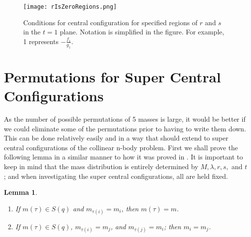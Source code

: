 \documentclass[11pt,leqno]{article}
\newtheorem{lemma}[theorem]{Lemma}
\theoremstyle{definition}
\theoremstyle{remark}
\numberwithin{equation}{section}
\begin{document}
\begin{figure}
\texttt{[image: rIsZeroRegions.png]}
 \caption{ \label{EL}  Conditions for central configuration for specified regions of $r$ and $s$ in the $t=1$ plane. Notation is simplified in the figure. For example, 1 represents $-\frac{f_1}{g_1}$.}
\end{figure}


\section{Permutations for Super Central Configurations}
As the number of possible permutations of 5 masses is large, it would be better if we could eliminate some of the permutations prior to having to write them down. This can be done relatively easily and in a way that should extend to super central configurations of the collinear n-body problem. First we shall prove the following lemma in a similar manner to how it was proved in \cite{ZX3}. It is important to keep in mind that the mass distribution is entirely determined by $M, \lambda, r,s,$ and $t$; and when investigating the super central configurations, all are held fixed.

\begin{lemma}
\begin{enumerate}
Fix $q=(-s-1, -1, r, 1, t+1)$ with $(s,t)\in \mathbf{R^+}^3$ and $-1<r<1$. Suppose $m=(m_1, m_2, m_3, m_4, m_5)\in S(q)$ and $\tau \in P(5)$. 
\item If $m(\tau)\in S(q)$ and $m_{\tau(i)}=m_i$, then $m(\tau)=m$.
\item If $m(\tau) \in S(q)$, $m_{\tau(i)}=m_j$, and $m_{\tau(j)}=m_i$; then $m_i=m_j$.
\end{enumerate}
\end{lemma}
\end{document}
